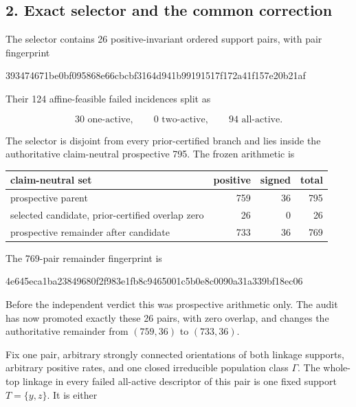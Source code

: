 \subsection{2. Exact selector and the common
correction}

The selector contains 26 positive-invariant ordered support pairs, with
pair fingerprint

\begin{CodeBlock}
393474671be0bf095868e66cbcbf3164d941b99191517f172a41f157e20b21af
\end{CodeBlock}

Their 124 affine-feasible failed incidences split as

\[
 30\text{ one-active},\qquad 0\text{ two-active},\qquad
 94\text{ all-active}.                                      \tag{2.1}
\]

The selector is disjoint from every prior-certified branch and lies
inside the authoritative claim-neutral prospective 795. The frozen
arithmetic is

{\small{} %
\begin{longtable}[]{@{}lrrr@{}}
\toprule\noalign{}
claim-neutral set & positive & signed & total \\
\midrule\noalign{}
\endhead
\bottomrule\noalign{}
\endlastfoot
prospective parent & 759 & 36 & 795 \\
selected candidate, prior-certified overlap zero & 26 & 0 & 26 \\
prospective remainder after candidate & 733 & 36 & 769 \\
\end{longtable}
}

The 769-pair remainder fingerprint is

\begin{CodeBlock}
4e645eca1ba23849680f2f983e1fb8c9465001c5b0e8c0090a31a339bf18ec06
\end{CodeBlock}

Before the independent verdict this was prospective arithmetic only. The
audit has now promoted exactly these 26 pairs, with zero overlap, and
changes the authoritative remainder from \((759,36)\) to \((733,36)\).

Fix one pair, arbitrary strongly connected orientations of both linkage
supports, arbitrary positive rates, and one closed irreducible
population class \(\Gamma\). The whole-top linkage in every failed
all-active descriptor of this pair is one fixed support \(T=\{y,z\}\).
It is either

